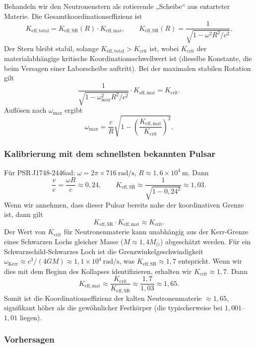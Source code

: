 \documentclass[12pt,a4paper]{article}
\begin{document}
	Behandeln wir den Neutronenstern als rotierende „Scheibe“ aus entarteter Materie. Die Gesamtkoordinationseffizienz ist
	\[
	K_{\mathrm{eff,total}} = K_{\mathrm{eff,SR}}(R) \cdot K_{\mathrm{eff,mat}},
	\qquad
	K_{\mathrm{eff,SR}}(R) = \frac{1}{\sqrt{1 - \omega^2 R^2/c^2}}.
	\]
	Der Stern bleibt stabil, solange \(K_{\mathrm{eff,total}} > K_{\mathrm{crit}}\) ist, wobei \(K_{\mathrm{crit}}\) der materialabhängige kritische Koordinationsschwellwert ist (dieselbe Konstante, die beim Versagen einer Laborscheibe auftritt). Bei der maximalen stabilen Rotation gilt
	\[
	\frac{1}{\sqrt{1 - \omega_{\max}^2 R^2/c^2}} \cdot K_{\mathrm{eff,mat}} = K_{\mathrm{crit}}.
	\]
	Auflösen nach \(\omega_{\max}\) ergibt
	\[
	\omega_{\max} = \frac{c}{R}\sqrt{1 - \left(\frac{K_{\mathrm{eff,mat}}}{K_{\mathrm{crit}}}\right)^2}.
	\]
	
	\subsubsection{Kalibrierung mit dem schnellsten bekannten Pulsar}
	
	Für PSR J1748‑2446ad: \(\omega = 2\pi\times716\ \text{rad/s}\), \(R\approx 1,6\times10^4\ \text{m}\). Dann
	\[
	\frac{v}{c} = \frac{\omega R}{c} \approx 0,24,\qquad
	K_{\mathrm{eff,SR}} \approx \frac{1}{\sqrt{1-0,24^2}} \approx 1,03.
	\]
	Wenn wir annehmen, dass dieser Pulsar bereits nahe der koordinativen Grenze ist, dann gilt
	\[
	K_{\mathrm{eff,SR}} \cdot K_{\mathrm{eff,mat}} \approx K_{\mathrm{crit}}.
	\]
	Der Wert von \(K_{\mathrm{crit}}\) für Neutronenmaterie kann unabhängig aus der Kerr-Grenze eines Schwarzen Lochs gleicher Masse (\(M\approx1,4M_\odot\)) abgeschätzt werden. Für ein Schwarzschild-Schwarzes Loch ist die Grenzwinkelgeschwindigkeit \(\omega_{\text{Kerr}} \approx c^3/(4GM) \approx 1,1\times10^4\ \text{rad/s}\), was \(K_{\mathrm{eff,SR}} \approx 1,7\) entspricht. Wenn wir dies mit dem Beginn des Kollapses identifizieren, erhalten wir \(K_{\mathrm{crit}} \approx 1,7\). Dann
	\[
	K_{\mathrm{eff,mat}} \approx \frac{K_{\mathrm{crit}}}{K_{\mathrm{eff,SR}}} \approx \frac{1,7}{1,03} \approx 1,65.
	\]
	Somit ist die Koordinationseffizienz der kalten Neutronenmaterie \(\approx 1,65\), signifikant höher als die gewöhnlicher Festkörper (die typischerweise bei \(1,001\)–\(1,01\) liegen).
	
	\subsubsection{Vorhersagen}
	
\end{document}
